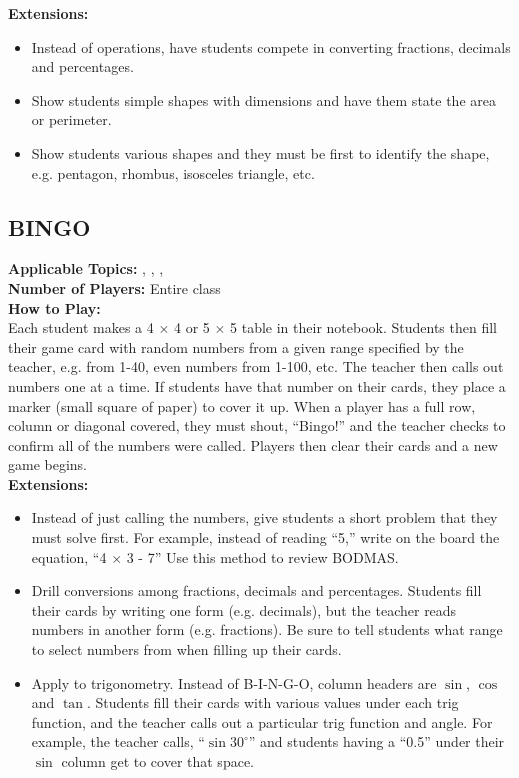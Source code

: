 	\noindent \textbf{Extensions:}
	\begin{itemize}
	\item Instead of operations, have students compete in converting fractions, decimals and percentages.
	\item Show students simple shapes with dimensions and have them state the area or perimeter.
	\item Show students various shapes and they must be first to identify the shape, e.g. pentagon, rhombus, isosceles triangle, etc.
	\end{itemize}
	
	\subsection{BINGO} \label{bingo}
	\textbf{Applicable Topics:} , , , \\	
	\textbf{Number of Players:} Entire class\\
	
	\noindent \textbf{How to Play:}\\
	Each student makes a 4 $\times$ 4 or 5 $\times$ 5 table in their notebook. Students then fill their game card with random numbers from a given range specified by the teacher, e.g. from 1-40, even numbers from 1-100, etc. The teacher then calls out numbers one at a time. If students have that number on their cards, they place a marker (small square of paper) to cover it up. When a player has a full row, column or diagonal covered, they must shout, ``Bingo!'' and the teacher checks to confirm all of the numbers were called. Players then clear their cards and a new game begins.\\
	
	\noindent \textbf{Extensions:}
	\begin{itemize}
	\item Instead of just calling the numbers, give students a short problem that they must solve first. For example, instead of reading ``5,'' write on the board the equation, ``4 $\times$ 3 - 7'' Use this method to review BODMAS.
	\item Drill conversions among fractions, decimals and percentages. Students fill their cards by writing one form (e.g. decimals), but the teacher reads numbers in another form (e.g. fractions). Be sure to tell students what range to select numbers from when filling up their cards.
	\item Apply to trigonometry. Instead of B-I-N-G-O, column headers are $\sin$, $\cos$ and $\tan$. Students fill their cards with various values under each trig function, and the teacher calls out a particular trig function and angle. For example, the teacher calls, ``$\sin 30^\circ$'' and students having a ``0.5'' under their $\sin$ column get to cover that space.
	\end{itemize}
	
